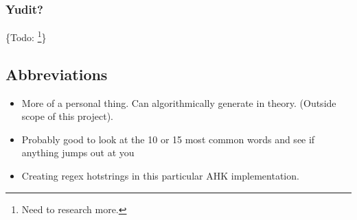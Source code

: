 \documentclass[11pt]{article}
\begin{document}
\subsubsection{Yudit?}
\label{sec:orgda3cc77}

\{Todo: \footnote{Need to research more.}\}

\subsection{Abbreviations}
\label{sec:org7764950}

\begin{itemize}
\item More of a personal thing. Can algorithmically generate in theory. (Outside scope of this project).
\item Probably good to look at the 10 or 15 most common words and see if anything jumps out at you
\item Creating regex hotstrings in this particular AHK implementation.
\end{itemize}
\end{document}
